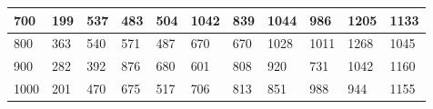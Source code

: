 \documentclass[10pt,letterpaper]{article}
\begin{document}
\begin{center}
\begin{table}
\begin{tabular} { |m{0.5cm}|m{1.3cm}|m{1.3cm}|m{1.3cm}|m{1.3cm}|m{1.3cm}|m{1.3cm}|m{1.3cm}|m{1.3cm}|m{1.3cm}|m{1.3cm}|}
\hline
\cellcolor{Gray}700 & \Large 199 & \Large 537 & \Large 483 & \Large 504 & \Large 1042 & \Large 839 & \Large 1044 & \Large 986 & \Large 1205 & \Large 1133 \\
\hline
\cellcolor{Gray}800 & \Large 363 & \Large 540 & \Large 571 & \Large 487 & \Large 670 & \Large 670 & \Large 1028 & \Large 1011 & \Large 1268 & \Large 1045 \\
\hline
\cellcolor{Gray}900 & \Large 282 & \Large 392 & \Large 876 & \Large 680 & \Large 601 & \Large 808 & \Large 920 & \Large 731 & \Large 1042 & \Large 1160 \\
\hline
\cellcolor{Gray}1000 & \Large 201 & \Large 470 & \Large 675 & \Large 517 & \Large 706 & \Large 813 & \Large 851 & \Large 988 & \Large 944 & \Large 1155 \\
\hline
\end{tabular} \\
\end{table}
\end{center}
\newpage 
{}
\end{document}
